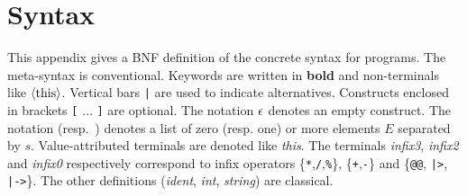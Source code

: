 
\chapter{Syntax}
\label{chap:syntax}

This appendix gives a BNF definition of the concrete syntax for \hocl programs.  The meta-syntax is
conventional. Keywords are written in \textbf{bold} and non-terminals like $\langle\textnormal{this}\rangle$.
Vertical bars {\tt |} are used to indicate alternatives.  Constructs enclosed in brackets {\tt [}
$\ldots$ {\tt ]} are optional. The notation $\epsilon$ denotes an empty construct. The notation
 (resp.~) denotes a list of zero (resp. one) or more elements
$E$ separated by $s$. Value-attributed terminals are denoted like \textit{this}. The terminals
\textit{infix3}, \textit{infix2} and \textit{infix0} respectively correspond to infix operators
\{\verb|*|,\verb|/|,\verb|%|\}, \{\verb|+|,\verb|-|\} and
\{\verb|@@|, \verb'|>', \verb'|->'\}. The other definitions (\textit{ident}, \textit{int},
\textit{string}) are classical.





